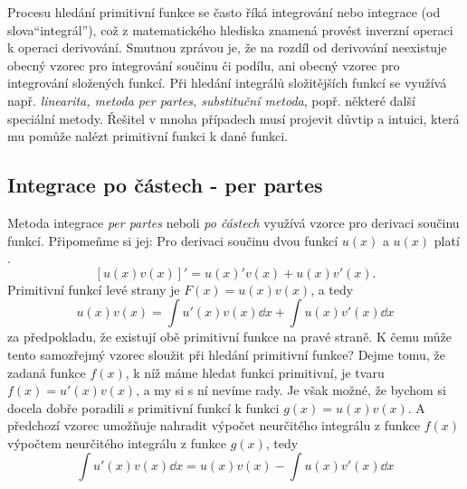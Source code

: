     Procesu hledání primitivní funkce se často říká integrování nebo integrace (od slova“integrál”),
    což z matematického hlediska znamená provést inverzní operaci k operaci derivování. Smutnou
    zprávou je, že na rozdíl od derivování neexistuje obecný vzorec pro integrování součinu či
    podílu, ani obecný vzorec pro integrování složených funkcí. Při hledání integrálů složitějších
    funkcí se využívá např. \emph{linearita, metoda per partes, substituční metoda}, popř. některé
    další speciální metody. Řešitel v mnoha případech musí projevit důvtip a intuici, která mu
    pomůže nalézt primitivní funkci k dané funkci.
  
    \subsection{Integrace po částech - per partes}
      Metoda integrace \emph{per partes} neboli \emph{po částech} využívá vzorce pro derivaci 
      součinu funkcí. Připomeňme si jej: Pro derivaci součinu dvou funkcí \(u(x)\) a \(u(x)\) platí
      \cite[p.~137]{Musilova2009MA1}.
      \begin{equation}\label{MA:eq_Int29}
        [u(x)v(x)]' = u(x)'v(x) + u(x)v'(x).
      \end{equation} 
      Primitivní funkcí levé strany je \(F(x) = u(x)v(x)\), a tedy
      \begin{equation*}
        u(x)v(x) =  \int u'(x)v(x)\dd{x} + \int u(x)v'(x)\dd{x}
      \end{equation*}  
      za předpokladu, že existují obě primitivní funkce na pravé straně. K čemu může tento
      samozřejmý vzorec sloužit při hledání primitivní funkce? Dejme tomu, že zadaná funkce
      \(f(x)\), k níž máme hledat funkci primitivní, je tvaru \(f(x) = u'(x)v(x)\), a my si s ní
      nevíme rady. Je však možné, že bychom si docela dobře poradili s primitivní funkcí k funkci
      \(g(x) = u(x)v(x)\). A předchozí vzorec umožňuje nahradit výpočet neurčitého integrálu z
      funkce \(f(x)\) výpočtem neurčitého integrálu z funkce \(g(x)\), tedy
      \begin{equation}\label{ma:eq_perpartes}
        \int u'(x)v(x)\dd{x} = u(x)v(x) - \int u(x)v'(x)\dd{x} 
      \end{equation}

